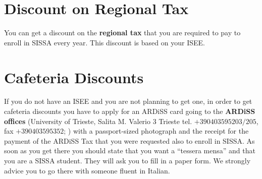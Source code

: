 \documentclass{sissavademecum}
\begin{document}
\section{Discount on Regional Tax}

You can get a discount on the \textbf{regional tax} that you are required to pay to enroll in SISSA every year. This discount is based on your ISEE.


\section{Cafeteria Discounts}

If you do not have an ISEE and you are not planning to get one, in order to get cafeteria discounts you have to apply for an ARDiSS card going to the \textbf{ARDiSS offices} (University of Trieste, Salita M. Valerio 3 Trieste tel. $+390403595203/205$, fax $+390403595352$; ) with a passport-sized photograph and the receipt for the payment of the ARDiSS Tax that you were requested also to enroll in SISSA. As soon as you get there you should state that you want a ``tessera mensa'' and that you are a SISSA student. They will ask you to fill in a paper form. We strongly advice you to go there with someone fluent in Italian.
\end{document}

